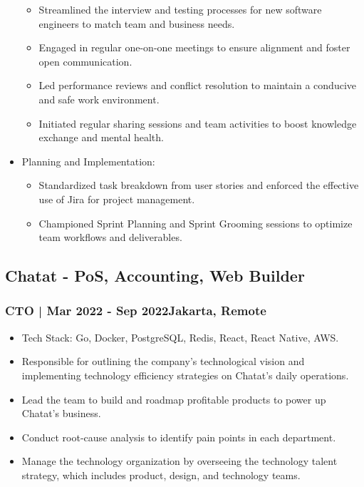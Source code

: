 \documentclass[11pt]{article}
\begin{document}
\begin{itemize}
\begin{itemize}
              \item Streamlined the interview and testing processes for new software engineers to match team and business needs.
              \item Engaged in regular one-on-one meetings to ensure alignment and foster open communication.
              \item Led performance reviews and conflict resolution to maintain a conducive and safe work environment.
              \item Initiated regular sharing sessions and team activities to boost knowledge exchange and mental health.
          \end{itemize}
    \item Planning and Implementation:
          \begin{itemize}
              \item Standardized task breakdown from user stories and enforced the effective use of Jira for project management.
              \item Championed Sprint Planning and Sprint Grooming sessions to optimize team workflows and deliverables.
          \end{itemize}
\end{itemize}

\subsection{Chatat - PoS, Accounting, Web Builder}
\subsubsection{CTO | Mar 2022 - Sep 2022\hfill Jakarta, Remote}
\begin{itemize}
    \item Tech Stack: Go, Docker, PostgreSQL, Redis, React, React Native, AWS.
    \item Responsible for outlining the company's technological vision and implementing technology efficiency strategies on Chatat's daily operations.
    \item Lead the team to build and roadmap profitable products to power up Chatat’s business.
    \item Conduct root-cause analysis to identify pain points in each department.
    \item Manage the technology organization by overseeing the technology talent strategy, which includes
          product, design, and technology teams.
\end{itemize}
\end{document}
